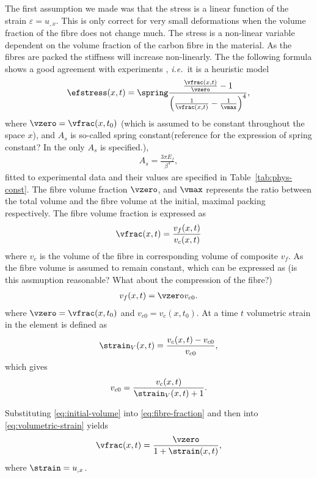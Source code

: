 \documentclass[twoside,a4paper,12pt]{article}
\newcommand{\tabref}[1]{Table~\ref{#1}}
\newcommand{\ie}{{\it i.e.\ }}
\newcommand{\note}[1]{{\color{red}(#1)}}
\begin{document}
The first assumption we made was that the stress is a linear function
of the strain $\varepsilon = u_{,x}$. This is only correct for very
small deformations when the volume fraction of the fibre does not
change much.  The stress is a non-linear variable dependent on the
volume fraction of the carbon fibre in the material. As the fibres are
packed the stiffness will increase non-linearly. The the following
formula shows a good agreement with experiments \citet{Gutowski1987},
\ie it is a heuristic model
% 
\begin{align}
  \efstress(x,t) = \spring
  \frac{\frac{\vfrac(x,t)}{\vzero} -1}{\left(\frac{1}{\vfrac(x,t)} -\frac{1}{\vmax}\right)^4}, \label{eq:stress-nonlin}
\end{align}
%
where $\vzero = \vfrac(x,t_0)$ \note{which is assumed to be constant
  throughout the space $x$}, and $A_s$ is so-called spring
constant\note{reference for the expression of spring constant? In the
  \citet{Gutowski1987} only $A_s$ is specified.},
%
\begin{align}
  A_s = \frac{3\pi E_f}{\beta^4},
\end{align}
%
fitted to experimental data and their values are specified in
\tabref{tab:phys-const}.
%
The fibre volume fraction $\vzero$, and $\vmax$ represents the ratio
between the total volume and the fibre volume at the initial, maximal
packing respectively. The fibre volume fraction is expressed as
\begin{align}
  \vfrac(x,t) = \frac{v_f(x,t)}{v_c(x,t)}
\end{align}
%
where $v_c$ is the volume of the fibre in corresponding volume of
composite $v_f$. As the fibre volume is assumed to remain constant,
which can be expressed as
%
\note{is this assmuption reasonable? What about the compression of the fibre?}
%
\begin{align}
  v_f(x,t) = \vzero v_{c0}. \label{eq:fibre-fraction}
\end{align}
where $\vzero = \vfrac(x,t_0)$ and $v_{c0} = v_c(x,t_0)$.
%
At a time $t$ volumetric strain in the element is defined as
\begin{align}
  \strain_V(x,t) = \frac{v_c(x,t) - v_{c0}}{v_{c0}}, \label{eq:volumetric-strain}
\end{align}
which gives
%
\begin{align}
{v_{c0}}= \frac{v_c(x,t) }{\strain_V(x,t) + 1}. \label{eq:initial-volume}
\end{align}

Substituting \eqref{eq:initial-volume} into \eqref{eq:fibre-fraction}
and then into \eqref{eq:volumetric-strain} yields
%
\begin{align}
  \vfrac(x,t) = \frac{\vzero}{1+\strain(x,t)}, \label{eq:fibre-volume}
\end{align}
%
where $\strain =  u_{,x}$.
\end{document}
